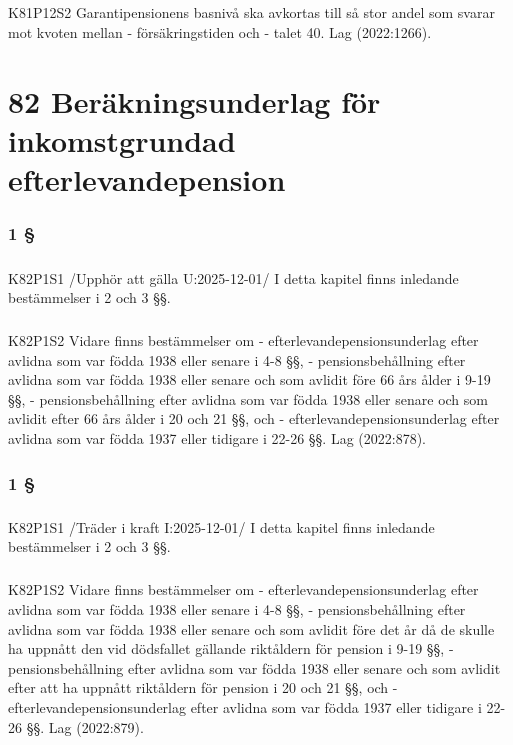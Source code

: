 \documentclass[a4paper,notitlepage,openany,10pt]{book}
\begin{document}
\paragraph*{}
{\tiny K81P12S2}
Garantipensionens basnivå ska avkortas till så stor andel som svarar mot kvoten mellan
\newline - försäkringstiden och
\newline - talet 40.
Lag (2022:1266).
\chapter*{82 Beräkningsunderlag för inkomstgrundad efterlevandepension}
\subsection*{1 §}
\paragraph*{}
{\tiny K82P1S1}
/Upphör att gälla U:2025-12-01/
I detta kapitel finns inledande bestämmelser i 2 och 3 §§.
\paragraph*{}
{\tiny K82P1S2}
Vidare finns bestämmelser om
\newline - efterlevandepensionsunderlag efter avlidna som var födda 1938 eller senare i 4-8 §§,
\newline - pensionsbehållning efter avlidna som var födda 1938 eller senare och som avlidit före 66 års ålder i 9-19 §§,
\newline - pensionsbehållning efter avlidna som var födda 1938 eller senare och som avlidit efter 66 års ålder i 20 och 21 §§, och
\newline - efterlevandepensionsunderlag efter avlidna som var födda 1937 eller tidigare i 22-26 §§.
Lag (2022:878).
\subsection*{1 §}
\paragraph*{}
{\tiny K82P1S1}
/Träder i kraft I:2025-12-01/
I detta kapitel finns inledande bestämmelser i 2 och 3 §§.
\paragraph*{}
{\tiny K82P1S2}
Vidare finns bestämmelser om
\newline - efterlevandepensionsunderlag efter avlidna som var födda 1938 eller senare i 4-8 §§,
\newline - pensionsbehållning efter avlidna som var födda 1938 eller senare och som avlidit före det år då de skulle ha uppnått den vid dödsfallet gällande riktåldern för pension i 9-19 §§,
\newline - pensionsbehållning efter avlidna som var födda 1938 eller senare och som avlidit efter att ha uppnått riktåldern för pension i 20 och 21 §§, och
\newline - efterlevandepensionsunderlag efter avlidna som var födda 1937 eller tidigare i 22-26 §§.
Lag (2022:879).
\end{document}
